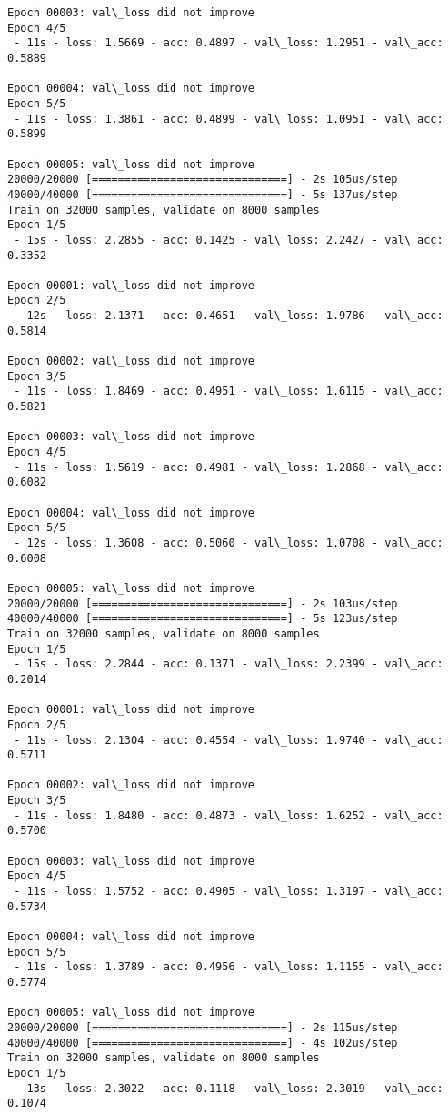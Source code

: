 \documentclass[11pt]{article}
\begin{document}
\begin{Verbatim}[commandchars=\\\{\}]
Epoch 00003: val\_loss did not improve
Epoch 4/5
 - 11s - loss: 1.5669 - acc: 0.4897 - val\_loss: 1.2951 - val\_acc: 0.5889

Epoch 00004: val\_loss did not improve
Epoch 5/5
 - 11s - loss: 1.3861 - acc: 0.4899 - val\_loss: 1.0951 - val\_acc: 0.5899

Epoch 00005: val\_loss did not improve
20000/20000 [==============================] - 2s 105us/step
40000/40000 [==============================] - 5s 137us/step
Train on 32000 samples, validate on 8000 samples
Epoch 1/5
 - 15s - loss: 2.2855 - acc: 0.1425 - val\_loss: 2.2427 - val\_acc: 0.3352

Epoch 00001: val\_loss did not improve
Epoch 2/5
 - 12s - loss: 2.1371 - acc: 0.4651 - val\_loss: 1.9786 - val\_acc: 0.5814

Epoch 00002: val\_loss did not improve
Epoch 3/5
 - 11s - loss: 1.8469 - acc: 0.4951 - val\_loss: 1.6115 - val\_acc: 0.5821

Epoch 00003: val\_loss did not improve
Epoch 4/5
 - 11s - loss: 1.5619 - acc: 0.4981 - val\_loss: 1.2868 - val\_acc: 0.6082

Epoch 00004: val\_loss did not improve
Epoch 5/5
 - 12s - loss: 1.3608 - acc: 0.5060 - val\_loss: 1.0708 - val\_acc: 0.6008

Epoch 00005: val\_loss did not improve
20000/20000 [==============================] - 2s 103us/step
40000/40000 [==============================] - 5s 123us/step
Train on 32000 samples, validate on 8000 samples
Epoch 1/5
 - 15s - loss: 2.2844 - acc: 0.1371 - val\_loss: 2.2399 - val\_acc: 0.2014

Epoch 00001: val\_loss did not improve
Epoch 2/5
 - 11s - loss: 2.1304 - acc: 0.4554 - val\_loss: 1.9740 - val\_acc: 0.5711

Epoch 00002: val\_loss did not improve
Epoch 3/5
 - 11s - loss: 1.8480 - acc: 0.4873 - val\_loss: 1.6252 - val\_acc: 0.5700

Epoch 00003: val\_loss did not improve
Epoch 4/5
 - 11s - loss: 1.5752 - acc: 0.4905 - val\_loss: 1.3197 - val\_acc: 0.5734

Epoch 00004: val\_loss did not improve
Epoch 5/5
 - 11s - loss: 1.3789 - acc: 0.4956 - val\_loss: 1.1155 - val\_acc: 0.5774

Epoch 00005: val\_loss did not improve
20000/20000 [==============================] - 2s 115us/step
40000/40000 [==============================] - 4s 102us/step
Train on 32000 samples, validate on 8000 samples
Epoch 1/5
 - 13s - loss: 2.3022 - acc: 0.1118 - val\_loss: 2.3019 - val\_acc: 0.1074


\end{Verbatim}
\end{document}
